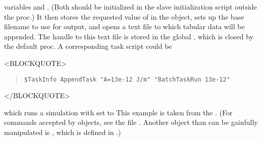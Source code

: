 variables  and .  (Both should be initialized in
the slave initialization script outside the  proc.)
It then stores the requested value of  in the
 object, sets up the base filename to use for
output, and opens a text file to which tabular
data will be appended.  The handle to this text
file is stored in the global , which is closed by the
default  proc.  A corresponding task script could
be
\begin{rawhtml}
<BLOCKQUOTE>
\end{rawhtml}
\begin{quote}
\begin{verbatim}
$TaskInfo AppendTask "A=13e-12 J/m" "BatchTaskRun 13e-12"
\end{verbatim}
\end{quote}
\begin{rawhtml}
</BLOCKQUOTE>
\end{rawhtml}
which runs a simulation with  set to
This example is taken from the 
.  (For
commands accepted by  objects, see the file .
Another object than can be gainfully manipulated is , which
is defined in .)

